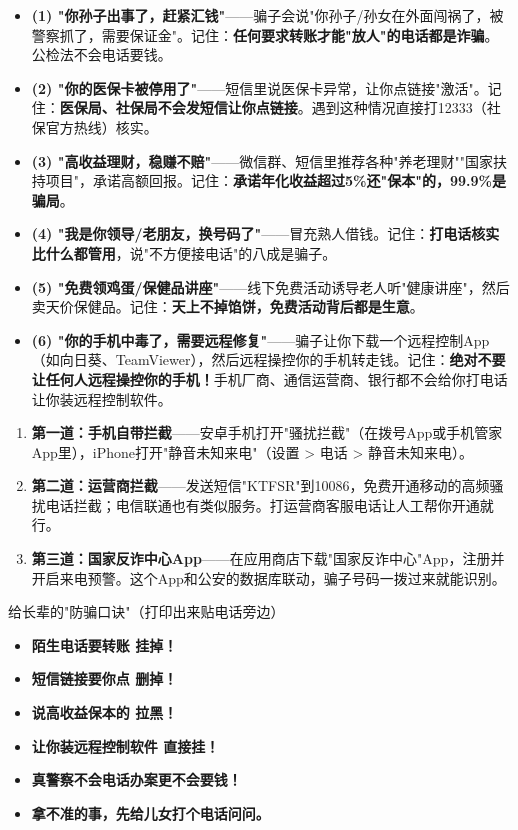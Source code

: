 \begin{itemize}
  \item \textbf{(1) "你孙子出事了，赶紧汇钱"}——骗子会说"你孙子/孙女在外面闯祸了，被警察抓了，需要保证金"。记住：\textbf{任何要求转账才能"放人"的电话都是诈骗}。公检法不会电话要钱。
  \item \textbf{(2) "你的医保卡被停用了"}——短信里说医保卡异常，让你点链接"激活"。记住：\textbf{医保局、社保局不会发短信让你点链接}。遇到这种情况直接打12333（社保官方热线）核实。
  \item \textbf{(3) "高收益理财，稳赚不赔"}——微信群、短信里推荐各种"养老理财""国家扶持项目"，承诺高额回报。记住：\textbf{承诺年化收益超过5\%还"保本"的，99.9\%是骗局}。
  \item \textbf{(4) "我是你领导/老朋友，换号码了"}——冒充熟人借钱。记住：\textbf{打电话核实比什么都管用}，说"不方便接电话"的八成是骗子。
  \item \textbf{(5) "免费领鸡蛋/保健品讲座"}——线下免费活动诱导老人听"健康讲座"，然后卖天价保健品。记住：\textbf{天上不掉馅饼，免费活动背后都是生意}。
  \item \textbf{(6) "你的手机中毒了，需要远程修复"}——骗子让你下载一个远程控制App（如向日葵、TeamViewer），然后远程操控你的手机转走钱。记住：\textbf{绝对不要让任何人远程操控你的手机！}手机厂商、通信运营商、银行都不会给你打电话让你装远程控制软件。
\end{itemize}


\begin{enumerate}
  \item \textbf{第一道：手机自带拦截}——安卓手机打开"骚扰拦截"（在拨号App或手机管家App里），iPhone打开"静音未知来电"（设置 > 电话 > 静音未知来电）。
  \item \textbf{第二道：运营商拦截}——发送短信"KTFSR"到10086，免费开通移动的高频骚扰电话拦截；电信联通也有类似服务。打运营商客服电话让人工帮你开通就行。
  \item \textbf{第三道：国家反诈中心App}——在应用商店下载"国家反诈中心"App，注册并开启来电预警。这个App和公安的数据库联动，骗子号码一拨过来就能识别。
\end{enumerate}

\begin{tcbwarn}{给长辈的"防骗口诀"（打印出来贴电话旁边）}
\begin{itemize}
  \item \textbf{陌生电话要转账 挂掉！}
  \item \textbf{短信链接要你点 删掉！}
  \item \textbf{说高收益保本的 拉黑！}
  \item \textbf{让你装远程控制软件 直接挂！}
  \item \textbf{真警察不会电话办案更不会要钱！}
  \item \textbf{拿不准的事，先给儿女打个电话问问。}
\end{itemize}

\end{tcbwarn}

